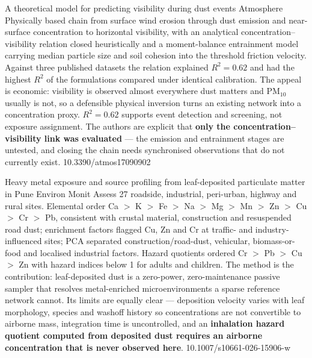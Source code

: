 \documentclass[10pt]{article}
\begin{document}
{A theoretical model for predicting visibility during dust events}
{Atmosphere}
{Physically based chain from surface wind erosion through dust emission and near-surface
concentration to horizontal visibility, with an analytical concentration--visibility
relation closed heuristically and a moment-balance entrainment model carrying median
particle size and soil cohesion into the threshold friction velocity. Against three
published datasets the relation explained \textbf{$R^2 = 0.62$} and had the highest $R^2$
of the formulations compared under identical calibration. The appeal is economic:
visibility is observed almost everywhere dust matters and PM$_{10}$ usually is not, so a
defensible physical inversion turns an existing network into a concentration proxy.
$R^2=0.62$ supports event detection and screening, not exposure assignment. The authors
are explicit that \textbf{only the concentration--visibility link was evaluated} --- the
emission and entrainment stages are untested, and closing the chain needs synchronised
observations that do not currently exist.}
{10.3390/atmos17090902}

{Heavy metal exposure and source profiling from leaf-deposited particulate matter in Pune}
{Environ Monit Assess}
{27 roadside, industrial, peri-urban, highway and rural sites. Elemental order
Ca $>$ K $>$ Fe $>$ Na $>$ Mg $>$ Mn $>$ Zn $>$ Cu $>$ Cr $>$ Pb, consistent with crustal
material, construction and resuspended road dust; enrichment factors flagged Cu, Zn and Cr
at traffic- and industry-influenced sites; PCA separated construction/road-dust, vehicular,
biomass-or-food and localised industrial factors. Hazard quotients ordered
Cr $>$ Pb $>$ Cu $>$ Zn with hazard indices below 1 for adults and children. The method is
the contribution: leaf-deposited dust is a zero-power, zero-maintenance passive sampler
that resolves metal-enriched microenvironments a sparse reference network cannot. Its
limits are equally clear --- deposition velocity varies with leaf morphology, species and
washoff history so concentrations are not convertible to airborne mass, integration time is
uncontrolled, and an \textbf{inhalation hazard quotient computed from deposited dust
requires an airborne concentration that is never observed here}.}
{10.1007/s10661-026-15906-w}
\end{document}
